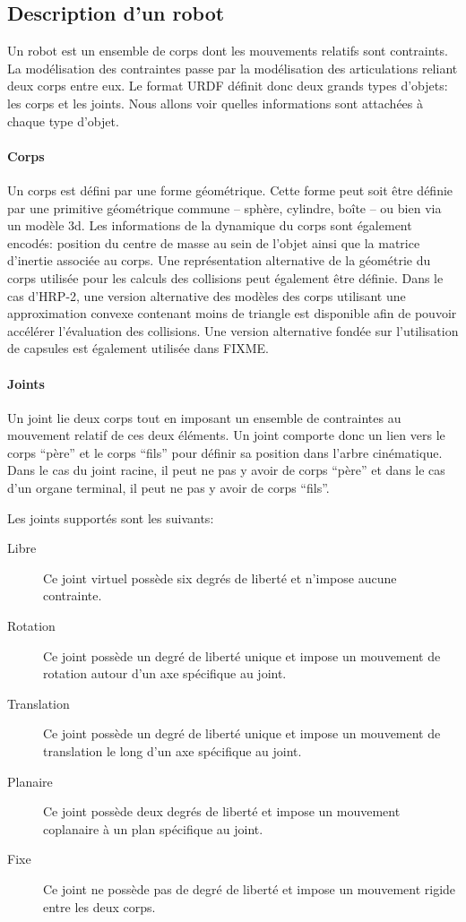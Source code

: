 \subsection{Description d'un robot}


Un robot est un ensemble de corps dont les mouvements relatifs sont
contraints. La modélisation des contraintes passe par la modélisation
des articulations reliant deux corps entre eux. Le format URDF définit
donc deux grands types d'objets: les corps et les joints. Nous allons
voir quelles informations sont attachées à chaque type d'objet.

\paragraph{Corps}

Un corps est défini par une forme géométrique. Cette forme peut soit
être définie par une primitive géométrique commune -- sphère,
cylindre, boîte -- ou bien via un modèle 3d. Les informations de la
dynamique du corps sont également encodés: position du centre de masse
au sein de l'objet ainsi que la matrice d'inertie associée au
corps. Une représentation alternative de la géométrie du corps
utilisée pour les calculs des collisions peut également être
définie. Dans le cas d'HRP-2, une version alternative des modèles des
corps utilisant une approximation convexe contenant moins de triangle
est disponible afin de pouvoir accélérer l'évaluation des
collisions. Une version alternative fondée sur l'utilisation de
capsules est également utilisée dans FIXME.


\paragraph{Joints}

Un joint lie deux corps tout en imposant un ensemble de contraintes au
mouvement relatif de ces deux éléments. Un joint comporte donc un lien
vers le corps ``père'' et le corps ``fils'' pour définir sa position
dans l'arbre cinématique. Dans le cas du joint racine, il peut ne pas
y avoir de corps ``père'' et dans le cas d'un organe terminal, il peut
ne pas y avoir de corps ``fils''.

Les joints supportés sont les suivants:
\begin{description}
\item[Libre] Ce joint virtuel possède six degrés de liberté et
  n'impose aucune contrainte.
\item[Rotation] Ce joint possède un degré de liberté unique et impose
  un mouvement de rotation autour d'un axe spécifique au joint.
\item[Translation] Ce joint possède un degré de liberté unique et
  impose un mouvement de translation le long d'un axe spécifique au
  joint.
\item[Planaire] Ce joint possède deux degrés de liberté et impose un
  mouvement coplanaire à un plan spécifique au joint.
\item[Fixe] Ce joint ne possède pas de degré de liberté et impose un
  mouvement rigide entre les deux corps.
\end{description}

